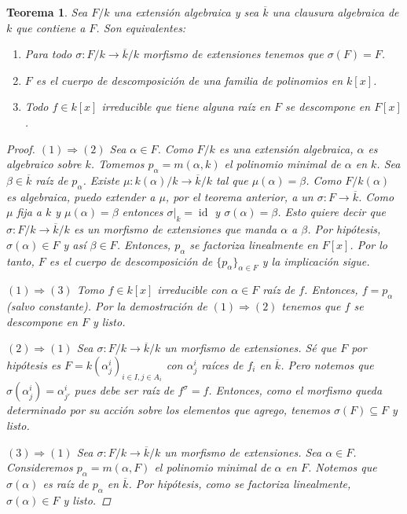 \documentclass[12pt]{book}
\newtheorem{teo}{Teorema}[section]
\theoremstyle{definition}
\DeclareMathOperator{\id}{id}
\begin{document}
\begin{teo}
Sea $F/k$ una extensión algebraica y sea $\overline{k}$ una clausura algebraica de $k$ que contiene a $F$. Son equivalentes:
\begin{enumerate}
\item Para todo $\sigma:F/k\to \overline{k}/k$ morfismo de extensiones tenemos que $\sigma(F)=F$.
\item $F$ es el cuerpo de descomposición de una familia de polinomios en $k[x]$.
\item Todo $f\in k[x]$ irreducible que tiene alguna raíz en $F$ se descompone en $F[x]$.
\end{enumerate}
\begin{proof}
$(1)\Longrightarrow (2)$ Sea $\alpha\in F$. Como $F/k$ es una extensión algebraica, $\alpha$ es algebraico sobre $k$. Tomemos $p_\alpha = m(\alpha,k)$ el polinomio minimal de $\alpha$ en $k$. Sea $\beta\in\overline{k}$ raíz de $p_\alpha$. Existe $\mu: k(\alpha)/k\to \overline{k}/k$ tal que $\mu(\alpha)=\beta$. Como $F/k(\alpha)$ es algebraica, puedo extender a $\mu$, por el teorema anterior, a un $\sigma:F\to \overline{k}$. Como $\mu$ fija a $k$ y $\mu(\alpha)=\beta$ entonces $\left.\sigma\right|_{k} = \id$ y $\sigma(\alpha)=\beta$. Esto quiere decir que $\sigma:F/k\to\overline{k}/k$ es un morfismo de extensiones que manda $\alpha$ a $\beta$. Por hipótesis, $\sigma(\alpha)\in F$ y así $\beta\in F$. Entonces, $p_\alpha$ se factoriza linealmente en $F[x]$. Por lo tanto, $F$ es el cuerpo de descomposición de $\{p_{\alpha}\}_{\alpha\in F}$ y la implicación sigue.

$(1)\Longrightarrow (3)$ Tomo $f\in k[x]$ irreducible con $\alpha\in F$ raíz de $f$. Entonces, $f=p_\alpha$ (salvo constante). Por la demostración de $(1)\Longrightarrow (2)$ tenemos que $f$ se descompone en $F$ y listo.

$(2)\Longrightarrow (1)$ Sea $\sigma:F/k\to \overline{k}/k$ un morfismo de extensiones. Sé que $F$ por hipótesis es $F=k(\alpha_j^{i})_{i\in I, j\in A_i}$ con $\alpha_j^i$ raíces de $f_i$ en $\overline{k}$. Pero notemos que $\sigma(\alpha_j^i) = \alpha_{j'}^i$ pues debe ser raíz de $f^\sigma = f$. Entonces, como el morfismo queda determinado por su acción sobre los elementos que agrego, tenemos $\sigma(F)\subseteq F$ y listo.

$(3)\Longrightarrow (1)$ Sea $\sigma:F/k\to \overline{k}/k$ un morfismo de extensiones. Sea $\alpha\in F$. Consideremos $p_\alpha = m(\alpha,F)$ el polinomio minimal de $\alpha$ en $F$. Notemos que $\sigma(\alpha)$ es raíz de $p_\alpha$ en $\overline{k}$. Por hipótesis, como se factoriza linealmente, $\sigma(\alpha)\in F$ y listo.
\end{proof}
\end{teo}
\end{document}
